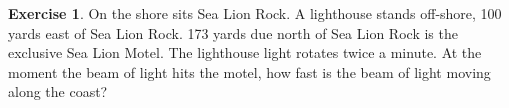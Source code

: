 \documentclass[11pt,reqno,final]{amsart}
\numberwithin{figure}{section}
\theoremstyle{definition} %
\newtheorem{exercise}[question]{Exercise}
\begin{document}
\newpage


\begin{exercise}
        On the shore sits Sea Lion Rock.
        A lighthouse stands off-shore, 100 yards east of Sea Lion Rock.
        173 yards due north of Sea Lion Rock is the exclusive Sea Lion Motel.
        The lighthouse light rotates twice a minute. At the moment the beam of light hits the motel, how fast is the beam of light moving along the coast?
\end{exercise}
\end{document}

